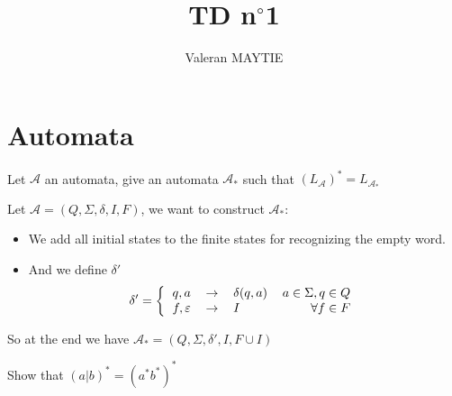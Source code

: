\documentclass{article}
\title{TD n$^\circ$1}
\author{Valeran MAYTIE}
\date{}
\theoremstyle{plain}
\begin{document}
  \maketitle

  \section{Automata}

  \exercice Let $\mathcal A$ an automata, give an automata $\mathcal A_*$ such
    that $(L_{\mathcal A})^* = L_{\mathcal A_*}$

  \begin{correction}{}{}
    Let $\mathcal A = (Q, \Sigma, \delta, I, F)$, we want to construct $\mathcal
    A_*$:

    \begin{itemize}
      \item We add all initial states to the finite states for recognizing
        the empty word.

      \item And we define $\delta'$
      \[
        \delta' = \left \{
          \begin{tabular}{l l l r}
            $q, a$ & $\to$ & $\delta(q, a)$ &
              $a \in \Sigma, q \in Q$ \\
            $f, \varepsilon$ & $\to$ & $I$ & $\forall f \in F$\\
          \end{tabular}
          \right.
      \]
    \end{itemize}

    So at the end we have $\mathcal A_* = (Q, \Sigma, \delta', I, F \cup I)$
  \end{correction}

  \exercice Show that $(a|b)^* = (a^*b^*)^*$
\end{document}
